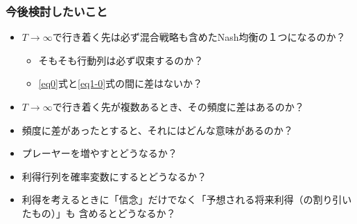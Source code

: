 \documentclass[dvipdfmx,fleqn]{beamer}
\begin{document}
\begin{frame}
\frametitle{今後検討したいこと}
\begin{itemize}\setlength{\parskip}{0.5em}
\item
$T \to \infty$で行き着く先は必ず混合戦略も含めたNash均衡の１つになるのか？

	\begin{itemize}\setlength{\parskip}{0.5em}
	\item
	そもそも行動列は必ず収束するのか？
	
	\item
	\eqref{eq0}式と\eqref{eq1-0}式の間に差はないか？
	
	\end{itemize}

\item
$T \to \infty$で行き着く先が複数あるとき、その頻度に差はあるのか？

\item
頻度に差があったとすると、それにはどんな意味があるのか？

\item
プレーヤーを増やすとどうなるか？

\item
利得行列を確率変数にするとどうなるか？

\item
利得を考えるときに「信念」だけでなく「予想される将来利得（の割り引いたもの）」も
含めるとどうなるか？

\end{itemize}
\end{frame}
\end{document}
